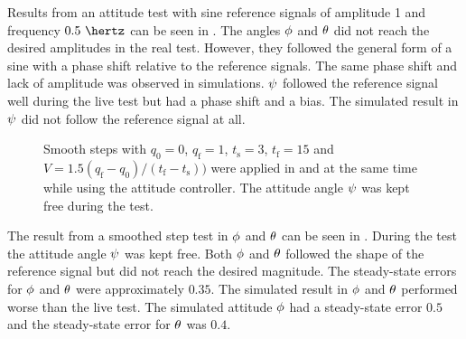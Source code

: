 Results from an attitude test with sine reference signals of amplitude 1 and frequency $0.5\ \hertz$ can be seen in . The angles $\phi$ and $\theta$ did not reach the desired amplitudes in the real test. However, they followed the general form of a sine with a phase shift relative to the reference signals. The same phase shift and lack of amplitude was observed in simulations. $\psi$ followed the reference signal well during the live test but had a phase shift and a bias. The simulated result in $\psi$ did not follow the reference signal at all. 

\begin{figure}
\centering
  \qquad
  \qquad
  \qquad
  \caption{\label{fig:StepPhiThetaAttitude}%
  Smooth steps with $q_{\text{0}} = 0$, $q_{\text{f}} = 1$, $t_{\text{s}} = 3$, $t_{\text{f}} = 15$ and $V = 1.5 (q_{\text{f}} - q_{\text{0}})/(t_{\text{f}} - t_{\text{s}}))$ were applied in \pitchAngle and \rollAngle at the same time while using the attitude controller. The attitude angle $\psi$ was kept free during the test.}
\end{figure}

The result from a smoothed step test in $\phi$ and $\theta$ can be seen in . During the test the attitude angle $\psi$ was kept free. Both $\phi$ and $\theta$ followed the shape of the reference signal but did not reach the desired magnitude. The steady-state errors for $\phi$ and $\theta$ were approximately $0.35$. The simulated result in $\phi$ and $\theta$ performed worse than the live test. The simulated attitude $\phi$ had a steady-state error $0.5$ and the steady-state error for $\theta$ was $0.4$.

